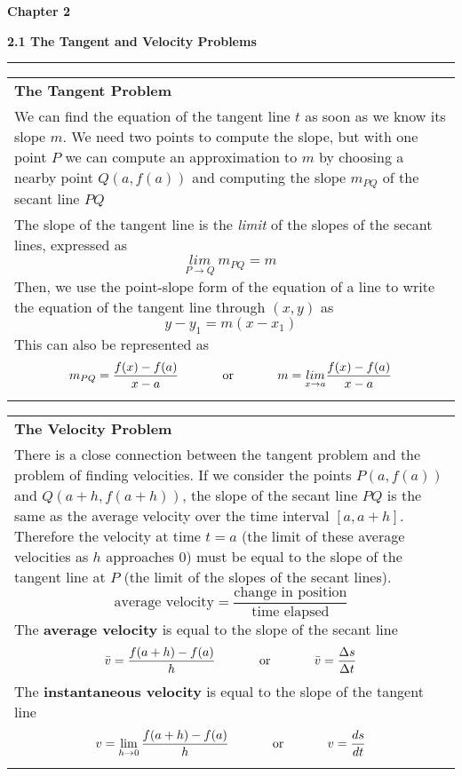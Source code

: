 \documentclass[fleqn]{article}
\begin{document}
\Huge\textbf{Chapter 2}
\vspace{16pt}

\begin{center}
\Large\textbf{2.1 The Tangent and Velocity Problems}

\noindent\hfill\rule{0.3\textwidth}{.4pt}\hfill
\vspace{12pt}

\large
\def\arraystretch{1.3}
{\setlength{\tabcolsep}{16pt}
\begin{tabularx}{.9\textwidth}{|X|}
\hline
	\vspace{1pt}
	\textbf{The Tangent Problem} \\[5pt]
	We can find the equation of the tangent line $t$ as soon as we know its slope $m$. We need two points to compute the slope, but with one point $P$ we can compute an approximation to $m$ by choosing a nearby point $Q(a, f(a))$ and computing the slope $m_{PQ}$ of the secant line $PQ$ \\[5pt]
	The slope of the tangent line is the \textit{limit} of the slopes of the secant lines, expressed as 
	$$\underset{P \to Q}{lim} \: m_{PQ} = m$$
	Then, we use the point-slope form of the equation of a line to write the equation of the tangent line through $(x, y)$ as
	$$y - y_1 = m(x-x_1)$$
	This can also be represented as
	$$m_{PQ} = \frac{f(x)-f(a)}{x-a} \text{\hspace{32pt} or \hspace{32pt}} m = \underset{x \to a}{lim}\frac{f(x)-f(a)}{x-a}$$ \\	
\hline
\end{tabularx}}
\vspace{12pt}

\def\arraystretch{1.3}
{\setlength{\tabcolsep}{16pt}
\begin{tabularx}{.9\textwidth}{|X|}
\hline
	\vspace{1pt}
	\textbf{The Velocity Problem} \\[5pt]
	There is a close connection between the tangent problem and the problem of finding velocities. If we consider the points $P(a, f(a))$ and $Q(a+h, f(a+h))$, the slope of the secant line $PQ$ is the same as the average velocity over the time interval $[a, a+h]$. Therefore the velocity at time $t=a$ (the limit of these average velocities as $h$ approaches $0$) must be equal to the slope of the tangent line at $P$ (the limit of the slopes of the secant lines).
	$$\text{average velocity} = \dfrac{\text{change in position}}{\text{time elapsed}}$$
	The \textbf{average velocity} is equal to the slope of the secant line
		$$\bar{v} = \frac{f(a+h)-f(a)}{h}\text{\hspace{32pt} or \hspace{32pt}} \bar{v} = \dfrac{\Delta s}{\Delta t}$$
	The \textbf{instantaneous velocity} is equal to the slope of the tangent line 
		$$v = \lim_{h \to 0} \frac{f(a+h)-f(a)}{h} \text{\hspace{32pt} or \hspace{32pt}} v = \dfrac{ds}{dt}$$ \\


\end{tabularx}}
\end{center}
\end{document}
